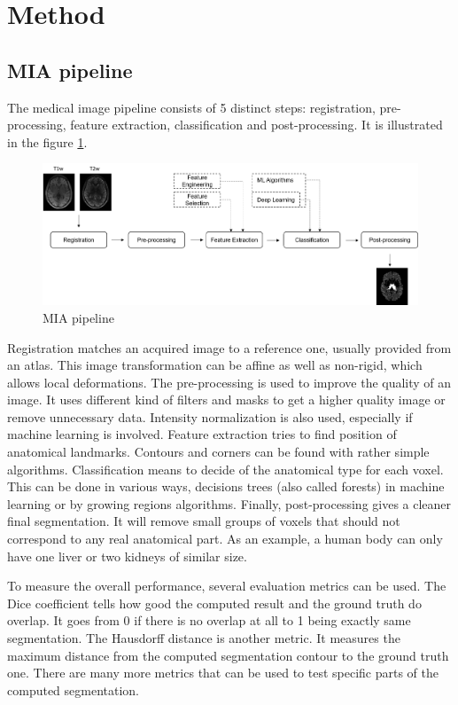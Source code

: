 \section*{Method}

\subsection*{MIA pipeline}
The medical image pipeline consists of 5 distinct steps: registration, pre-processing, feature extraction, classification and post-processing. It is illustrated in the figure \ref{fig:pipeline}.

\begin{figure}[h!]
	\centering
	\includegraphics[width = .45 \textwidth]{img/pipeline}
	\caption{MIA pipeline}
	\label{fig:pipeline}
\end{figure}

Registration matches an acquired image to a reference one, usually provided from an atlas. This image transformation can be affine as well as non-rigid, which allows local deformations. The pre-processing is used to improve the quality of an image. It uses different kind of filters and masks to get a higher quality image or remove unnecessary data. Intensity normalization is also used, especially if machine learning is involved. Feature extraction tries to find position of anatomical landmarks. Contours and corners can be found with rather simple algorithms. Classification means to decide of the anatomical type for each voxel. This can be done in various ways, decisions trees (also called forests) in machine learning or by growing regions algorithms. Finally, post-processing gives a cleaner final segmentation. It will remove small groups of voxels that should not correspond to any real anatomical part. As an example, a human body can only have one liver or two kidneys of similar size.

To measure the overall performance, several evaluation metrics can be used. The Dice coefficient tells how good the computed result and the ground truth do overlap. It goes from 0 if there is no overlap at all to 1 being exactly same segmentation. The Hausdorff distance is another metric. It measures the maximum distance from the computed segmentation contour to the ground truth one. There are many more metrics that can be used to test specific parts of the computed segmentation.

